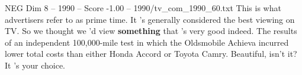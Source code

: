 \begin{textsample}{NEG Dim 8 – 1990 – Score -1.00 – 1990/tv\_com\_1990\_60.txt}  \label{ex:f8_neg_025}
This is what advertisers refer to as prime time.
It 's generally considered the best viewing on TV.
So we thought we 'd view \textbf{something} that 's very good indeed.
The results of an independent 100,000-mile test in which the Oldsmobile Achieva incurred lower total costs than either Honda Accord or Toyota Camry.
Beautiful, isn't it?
It 's your choice.

\end{textsample}
